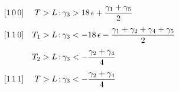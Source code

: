 \documentclass[preview]{standalone}
\begin{document}
\begin{align*}
\begin{array}{@{}l@{\quad}r@{\,:\,}l@{}}
            {[1\,0\,0]} & T>L   & \gamma_3 > 18\,\epsilon + \dfrac{\gamma_1+\gamma_5}{2} \\[2.5ex]
            {[1\,1\,0]} & T_1>L & \gamma_3 < -18\,\epsilon - \dfrac{\gamma_1+\gamma_2+\gamma_4+\gamma_5}{2} \\[2.5ex]
                        & T_2>L & \gamma_3 < -\dfrac{\gamma_2+\gamma_4}{4} \\[2.5ex]
            {[1\,1\,1]} & T>L   & \gamma_3 < -\dfrac{\gamma_2+\gamma_4}{4}
            \end{array}
\end{align*}
\end{document}
